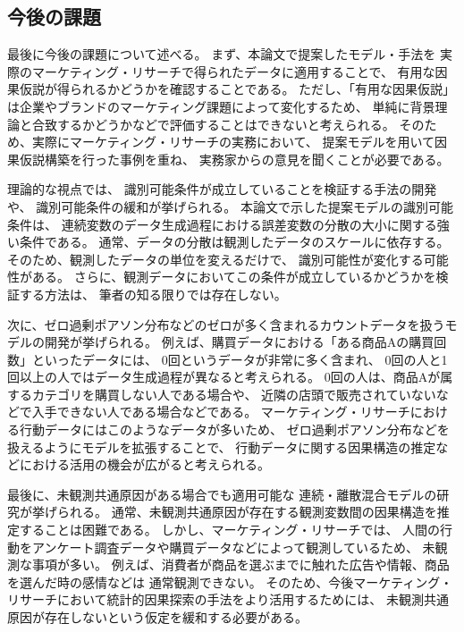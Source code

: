 
\subsection{今後の課題}

最後に今後の課題について述べる。
まず、本論文で提案したモデル・手法を
実際のマーケティング・リサーチで得られたデータに適用することで、
有用な因果仮説が得られるかどうかを確認することである。
ただし、「有用な因果仮説」は企業やブランドのマーケティング課題によって変化するため、
単純に背景理論と合致するかどうかなどで評価することはできないと考えられる。
そのため、実際にマーケティング・リサーチの実務において、
提案モデルを用いて因果仮説構築を行った事例を重ね、
実務家からの意見を聞くことが必要である。

理論的な視点では、
識別可能条件が成立していることを検証する手法の開発や、
識別可能条件の緩和が挙げられる。
本論文で示した提案モデルの識別可能条件は、
連続変数のデータ生成過程における誤差変数の分散の大小に関する強い条件である。
通常、データの分散は観測したデータのスケールに依存する。
そのため、観測したデータの単位を変えるだけで、
識別可能性が変化する可能性がある。
さらに、観測データにおいてこの条件が成立しているかどうかを検証する方法は、
筆者の知る限りでは存在しない。

次に、ゼロ過剰ポアソン分布などのゼロが多く含まれるカウントデータを扱うモデルの開発が挙げられる。
例えば、購買データにおける「ある商品Aの購買回数」といったデータには、
0回というデータが非常に多く含まれ、
0回の人と1回以上の人ではデータ生成過程が異なると考えられる。
0回の人は、商品Aが属するカテゴリを購買しない人である場合や、
近隣の店頭で販売されていないなどで入手できない人である場合などである。
マーケティング・リサーチにおける行動データにはこのようなデータが多いため、
ゼロ過剰ポアソン分布などを扱えるようにモデルを拡張することで、
行動データに関する因果構造の推定などにおける活用の機会が広がると考えられる。

最後に、未観測共通原因がある場合でも適用可能な
連続・離散混合モデルの研究が挙げられる。
通常、未観測共通原因が存在する観測変数間の因果構造を推定することは困難である。
しかし、マーケティング・リサーチでは、
人間の行動をアンケート調査データや購買データなどによって観測しているため、
未観測な事項が多い。
例えば、消費者が商品を選ぶまでに触れた広告や情報、商品を選んだ時の感情などは
通常観測できない。
そのため、今後マーケティング・リサーチにおいて統計的因果探索の手法をより活用するためには、
未観測共通原因が存在しないという仮定を緩和する必要がある。
